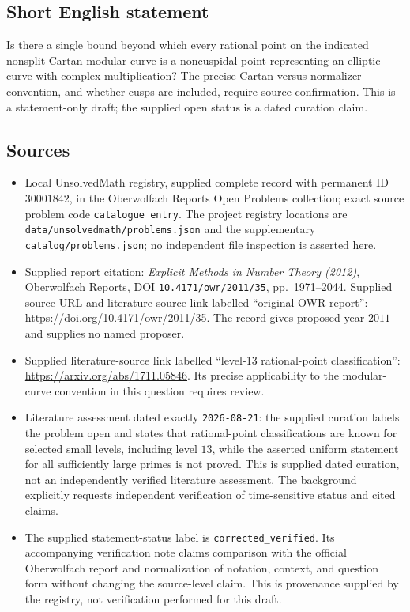 \documentclass[11pt]{article}
\begin{document}
\subsection{Short English statement}
Is there a single bound beyond which every rational point on the indicated nonsplit Cartan modular curve is a noncuspidal point representing an elliptic curve with complex multiplication? The precise Cartan versus normalizer convention, and whether cusps are included, require source confirmation. This is a statement-only draft; the supplied open status is a dated curation claim.
\subsection{Sources}
\begin{itemize}
\item Local UnsolvedMath registry, supplied complete record with permanent ID \(30001842\), in the Oberwolfach Reports Open Problems collection; exact source problem code \texttt{catalogue entry}. The project registry locations are \texttt{data/unsolvedmath/problems.json} and the supplementary \texttt{catalog/problems.json}; no independent file inspection is asserted here.
\item Supplied report citation: \emph{Explicit Methods in Number Theory (2012)}, Oberwolfach Reports, DOI \texttt{10.4171/owr/2011/35}, pp.~1971--2044. Supplied source URL and literature-source link labelled ``original OWR report'': \url{https://doi.org/10.4171/owr/2011/35}. The record gives proposed year \(2011\) and supplies no named proposer.
\item Supplied literature-source link labelled ``level-13 rational-point classification'': \url{https://arxiv.org/abs/1711.05846}. Its precise applicability to the modular-curve convention in this question requires review.
\item Literature assessment dated exactly \texttt{2026-08-21}: the supplied curation labels the problem open and states that rational-point classifications are known for selected small levels, including level \(13\), while the asserted uniform statement for all sufficiently large primes is not proved. This is supplied dated curation, not an independently verified literature assessment. The background explicitly requests independent verification of time-sensitive status and cited claims.
\item The supplied statement-status label is \texttt{corrected\_verified}. Its accompanying verification note claims comparison with the official Oberwolfach report and normalization of notation, context, and question form without changing the source-level claim. This is provenance supplied by the registry, not verification performed for this draft.
\end{itemize}
\end{document}

